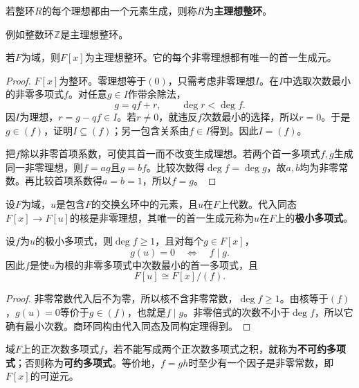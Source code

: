 \begin{definition}\label{p2:concept:c3-pid}
若整环$R$的每个理想都由一个元素生成，则称$R$为\textbf{主理想整环}。
\end{definition}
例如整数环$\mathbb Z$是主理想整环。
\begin{theorem}\label{p2:field-poly-pid}
若$F$为域，则$F[x]$为主理想整环。它的每个非零理想都有唯一的首一生成元。
\end{theorem}
\begin{proof}
$F[x]$为整环。零理想等于$(0)$，只需考虑非零理想$I$。在$I$中选取次数最小的非零多项式$f$。对任意$g\in I$作带余除法，
\[
g=qf+r,\qquad\deg r<\deg f.
\]
因$I$为理想，$r=g-qf\in I$。若$r\ne0$，就违反$f$次数最小的选择，所以$r=0$。于是$g\in(f)$，证明$I\subseteq(f)$；另一包含关系由$f\in I$得到。因此$I=(f)$。

把$f$除以非零首项系数，可使其首一而不改变生成理想。若两个首一多项式$f,g$生成同一非零理想，则$f=ag$且$g=bf$。比较次数得$\deg f=\deg g$，故$a,b$均为非零常数。再比较首项系数得$a=b=1$，所以$f=g$。
\end{proof}

\begin{definition}\label{p2:concept:c3-minimal-polynomial}
设$F$为域，$u$是包含$F$的交换幺环中的元素，且$u$在$F$上代数。代入同态$F[x]\to F[u]$的核是非零理想，其唯一的首一生成元称为$u$在$F$上的\textbf{极小多项式}。
\end{definition}

\begin{proposition}
设$f$为$u$的极小多项式，则$\deg f\ge1$，且对每个$g\in F[x]$，
\[
g(u)=0\quad\Longleftrightarrow\quad f\mid g.
\]
因此$f$是使$u$为根的非零多项式中次数最小的首一多项式，且
\[
F[u]\cong F[x]/(f).
\]
\end{proposition}
\begin{proof}
非零常数代入后不为零，所以核不含非零常数，$\deg f\ge1$。由核等于$(f)$，$g(u)=0$等价于$g\in(f)$，也就是$f\mid g$。非零倍式的次数不小于$\deg f$，所以它确有最小次数。商环同构由代入同态及同构定理得到。
\end{proof}

\begin{definition}\label{p2:concept:c3-irreducible}
域$F$上的正次数多项式$f$，若不能写成两个正次数多项式之积，就称为\textbf{不可约多项式}；否则称为\textbf{可约多项式}。等价地，$f=gh$时至少有一个因子是非零常数，即$F[x]$的可逆元。
\end{definition}

